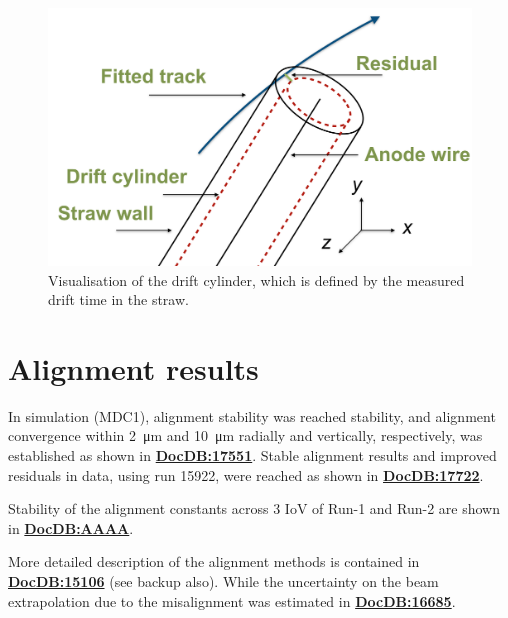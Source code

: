 \documentclass[12pt]{article}
\begin{document}
\begin{figure}[tbp]
\centering
\includegraphics[scale = 0.45]{fig/DriftCylinder.png}  
    \caption{Visualisation of the drift cylinder, which is defined by the measured drift time in the straw.}
\label{fig:DriftCylinder} 
\end{figure}

\section{Alignment results}
In simulation (MDC1), alignment stability was reached stability, and alignment convergence within \SI{2}{\micro\metre} and \SI{10}{\micro\metre} radially and vertically, respectively, was established as shown in \textbf{\href{https://gm2-docdb.fnal.gov/cgi-bin/private/ShowDocument?docid=17551}{DocDB:17551}}. Stable alignment results and improved residuals in data, using run 15922, were reached as shown in \textbf{\href{https://gm2-docdb.fnal.gov/cgi-bin/private/ShowDocument?docid=17722}{DocDB:17722}}.

Stability of the alignment constants across 3 IoV of Run-1 and Run-2 are shown in \textbf{\href{https://gm2-docdb.fnal.gov/cgi-bin/private/ShowDocument?docid=AAAA}{DocDB:AAAA}}.

More detailed description of the alignment methods is contained in \textbf{\href{https://gm2-docdb.fnal.gov/cgi-bin/private/ShowDocument?docid=15106}{DocDB:15106}} (see backup also). While the uncertainty on the beam extrapolation due to the misalignment was estimated in \textbf{\href{https://gm2-docdb.fnal.gov/cgi-bin/private/ShowDocument?docid=16685}{DocDB:16685}}. 
\end{document}
